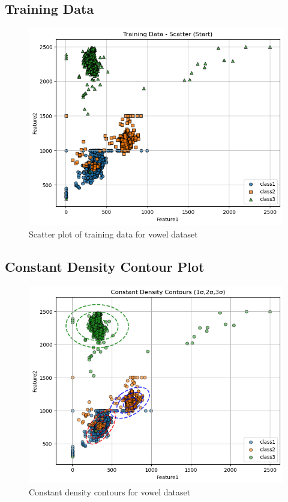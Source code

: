 \documentclass[12pt,a4paper]{article}
\begin{document}
\subsection{Training Data}
\begin{figure}[H]
    \centering
    \includegraphics[width=\linewidth]{images/RD_Group04_images/01_training data_scatter.png}
    \caption{Scatter plot of training data for vowel dataset}
\end{figure}

\subsection{Constant Density Contour Plot}
\begin{figure}[H]
    \centering
    \includegraphics[width=\linewidth]{images/RD_Group04_images/02_constant_density_contour.png}
    \caption{Constant density contours for vowel dataset}
\end{figure}
\end{document}
